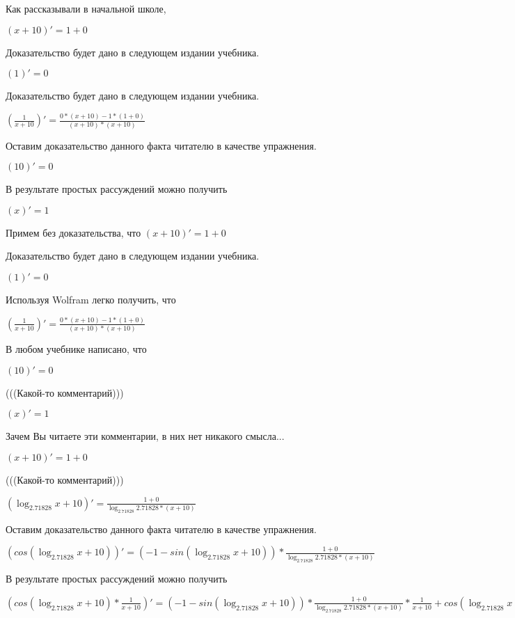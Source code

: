 \documentclass[12pt,a4paper,fleqn]{article}
\theoremstyle{definition}
\begin{document}
Как рассказывали в начальной школе,

$( x  +  10 )' =  1  +  0 $

Доказательство будет дано в следующем издании учебника.

$( 1 )' =  0 $

Доказательство будет дано в следующем издании учебника.

$(\frac{ 1 }{ x  +  10 }
)' = \frac{ 0  * ( x  +  10 ) -  1  * ( 1  +  0 )}{( x  +  10 ) * ( x  +  10 )}
$

Оставим доказательство данного факта читателю в качестве упражнения.

$( 10 )' =  0 $

В результате простых рассуждений можно получить

$( x )' =  1 $

Примем без доказательства, что
$( x  +  10 )' =  1  +  0 $

Доказательство будет дано в следующем издании учебника.

$( 1 )' =  0 $

Используя Wolfram легко получить, что

$(\frac{ 1 }{ x  +  10 }
)' = \frac{ 0  * ( x  +  10 ) -  1  * ( 1  +  0 )}{( x  +  10 ) * ( x  +  10 )}
$

В любом учебнике написано, что

$( 10 )' =  0 $

(((Какой-то комментарий)))

$( x )' =  1 $

Зачем Вы читаете эти комментарии, в них нет никакого смысла...

$( x  +  10 )' =  1  +  0 $

(((Какой-то комментарий)))

$(\log_{ 2.71828 }{ x  +  10 })' = \frac{ 1  +  0 }{\log_{ 2.71828 }{ 2.71828 } * ( x  +  10 )}
$

Оставим доказательство данного факта читателю в качестве упражнения.

$(cos(\log_{ 2.71828 }{ x  +  10 }))' = ( -1  - sin(\log_{ 2.71828 }{ x  +  10 })) * \frac{ 1  +  0 }{\log_{ 2.71828 }{ 2.71828 } * ( x  +  10 )}
$

В результате простых рассуждений можно получить

$(cos(\log_{ 2.71828 }{ x  +  10 }) * \frac{ 1 }{ x  +  10 }
)' = ( -1  - sin(\log_{ 2.71828 }{ x  +  10 })) * \frac{ 1  +  0 }{\log_{ 2.71828 }{ 2.71828 } * ( x  +  10 )}
 * \frac{ 1 }{ x  +  10 }
 + cos(\log_{ 2.71828 }{ x  +  10 }) * \frac{ 0  * ( x  +  10 ) -  1  * ( 1  +  0 )}{( x  +  10 ) * ( x  +  10 )}
$
\end{document}
